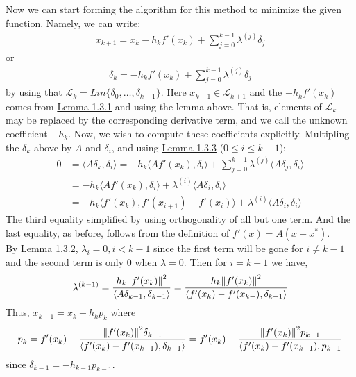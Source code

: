 \documentclass[12pt,a4paper]{article}
\begin{document}
	Now we can start forming the algorithm for this method to minimize the given function. Namely, we can write:
	\begin{align*}
		x_{k+1} = x_k - h_kf'(x_k) + \sum_{j=0}^{k-1}\lambda^{(j)}\delta_j
	\end{align*}
	or 
	\begin{align*}
		\delta_k = -h_kf'(x_k) + \sum_{j=0}^{k-1}\lambda^{(j)}\delta_j
	\end{align*}
	by using that $\mathcal{L}_k = Lin \{\delta_0, \ldots , \delta_{k-1}\}$. Here $x_{k+1} \in \mathcal{L}_{k+1}$ and the $-h_kf'(x_k)$ comes from \hyperref[lem131]{Lemma 1.3.1} and using the lemma above. That is, elements of $\mathcal{L}_k$ may be replaced by the corresponding derivative term, and we call the unknown coefficient $-h_k$. Now, we wish to compute these coefficients explicitly. Multipling the $\delta_k$ above by $A$ and $\delta_i$, and using \hyperref[lem133]{Lemma 1.3.3} ($0 \leq i \leq k-1$):
	\begin{align*}
		0 &= \langle A \delta_k, \delta_i \rangle = -h_k \langle A f'(x_k), \delta_i \rangle + \sum_{j=0}^{k-1}\lambda^{(j)}\langle A\delta_j, \delta_i \rangle \\
		&= -h_k \langle Af'(x_k), \delta_i \rangle + \lambda^{(i)}\langle A \delta_i, \delta_i \rangle \\
		&= -h_k \langle f'(x_k), f'(x_{i+1}) - f'(x_i) \rangle + \lambda^{(i)}\langle A\delta_i, \delta_i \rangle 
	\end{align*}
	The third equality simplified by using orthogonality of all but one term. And the last equality, as before, follows from the definition of $f'(x) = A(x - x^*)$.\\
	By \hyperref[lem132]{Lemma 1.3.2}, $\lambda_i = 0, i < k-1$ since the first term will be gone for $i \neq k-1$ and the second term is only $0$ when $\lambda=0$. Then for $i=k-1$ we have,
	\begin{align*}
		\lambda^{(k-1)} = \frac{h_k \norm{f'(x_k)}^2}{\langle A\delta_{k-1}, \delta_{k-1} \rangle} = \frac{h_k\norm{f'(x_k)}^2}{\langle f'(x_k) - f'(x_{k-}), \delta_{k-1} \rangle} 
	\end{align*}
	Thus, $x_{k+1} = x_k - h_kp_k$ where
	\begin{align*}
		p_k = f'(x_k) - \frac{\norm{f'(x_k)}^2 \delta_{k-1}}{\langle f'(x_k) - f'(x_{k-1}),\delta_{k-1} \rangle } = f'(x_k) - \frac{\norm{f'(x_k)}^2p_{k-1}}{\langle f'(x_k) - f'(x_{k-1}),p_{k-1}}
	\end{align*}
	since $\delta_{k-1} = -h_{k-1}p_{k-1}$. \\
\end{document}
